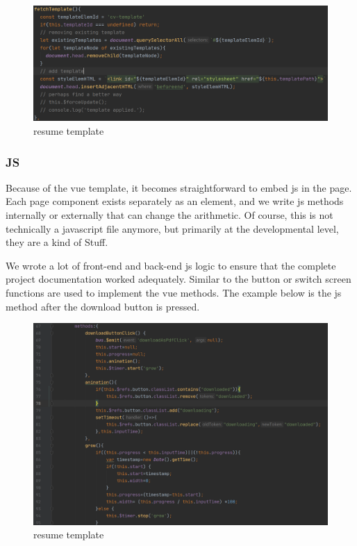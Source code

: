 \documentclass[11pt]{article}
\begin{document}
\begin{spacing}{1.0}
\begin{itemize}
 \begin{figure}[H]
	\centering
	\includegraphics[scale=.4]{figures/cssTemplate.png}
	\caption{resume template}
	\label{fig:12}
\end{figure}
		
	\end{itemize}
	\subsubsection{JS}Because of the vue template, it becomes straightforward to embed js in the page. Each page component exists separately as an element, and we write js methods internally or externally that can change the arithmetic. Of course, this is not technically a javascript file anymore, but primarily at the developmental level, they are a kind of Stuff.
	
	We wrote a lot of front-end and back-end js logic to ensure that the complete project documentation worked adequately. Similar to the button or switch screen functions are used to implement the vue methods. The example below is the js method after the download button is pressed.
	 \begin{figure}[H]
		\centering
		\includegraphics[scale=.4]{figures/downloadButtonJS.png}
		\caption{resume template}
		\label{fig:14}
	\end{figure}

\end{spacing}
\end{document}
